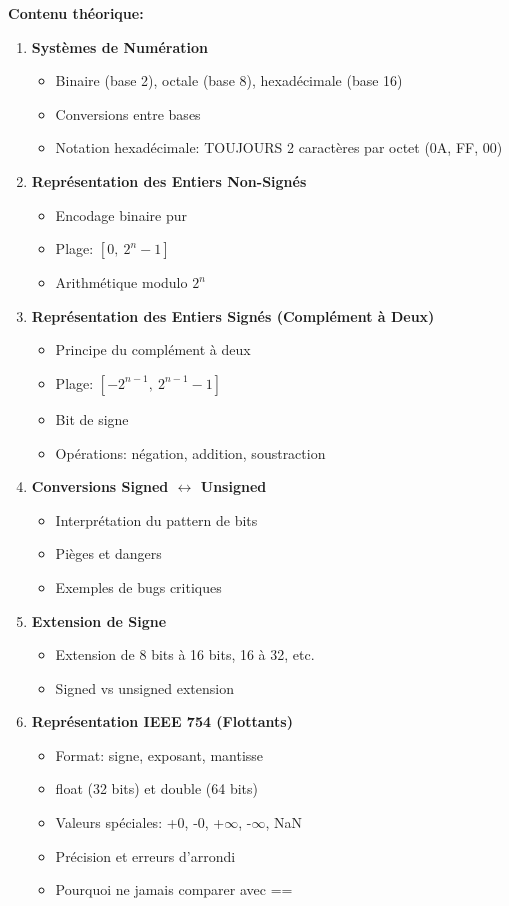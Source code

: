 \documentclass[10pt,a4paper]{article}
\begin{document}
\textbf{Contenu théorique:}
\begin{enumerate}
\item \textbf{Systèmes de Numération}
   \begin{itemize}
   \item Binaire (base 2), octale (base 8), hexadécimale (base 16)
   \item Conversions entre bases
   \item Notation hexadécimale: TOUJOURS 2 caractères par octet (0A, FF, 00)
   \end{itemize}

\item \textbf{Représentation des Entiers Non-Signés}
   \begin{itemize}
   \item Encodage binaire pur
   \item Plage: $[0,\ 2^n - 1]$
   \item Arithmétique modulo $2^n$
   \end{itemize}

\item \textbf{Représentation des Entiers Signés (Complément à Deux)}
   \begin{itemize}
   \item Principe du complément à deux
   \item Plage: $[-2^{n-1},\ 2^{n-1} - 1]$
   \item Bit de signe
   \item Opérations: négation, addition, soustraction
   \end{itemize}

\item \textbf{Conversions Signed $\leftrightarrow$ Unsigned}
   \begin{itemize}
   \item Interprétation du pattern de bits
   \item Pièges et dangers
   \item Exemples de bugs critiques
   \end{itemize}

\item \textbf{Extension de Signe}
   \begin{itemize}
   \item Extension de 8 bits à 16 bits, 16 à 32, etc.
   \item Signed vs unsigned extension
   \end{itemize}

\item \textbf{Représentation IEEE 754 (Flottants)}
   \begin{itemize}
   \item Format: signe, exposant, mantisse
   \item float (32 bits) et double (64 bits)
   \item Valeurs spéciales: +0, -0, +$\infty$, -$\infty$, NaN
   \item Précision et erreurs d'arrondi
   \item Pourquoi ne jamais comparer avec ==
   \end{itemize}


\end{enumerate}
\end{document}
